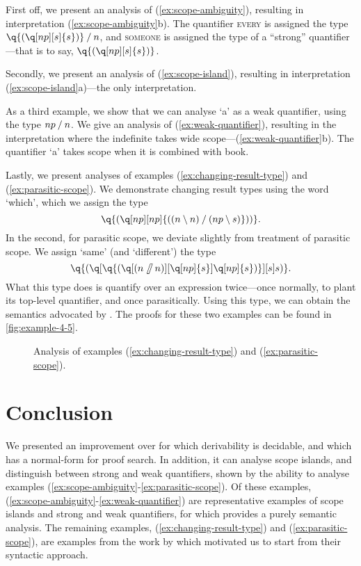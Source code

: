 \documentclass[10pt,a4paper]{llncs}
\begin{document}
First off, we present an analysis of (\ref{ex:scope-ambiguity}),
resulting in interpretation (\ref{ex:scope-ambiguity}b). The
quantifier \textsc{every} is assigned the type
$\q{(\q[np][s]{s})}\impl{n}$, and \textsc{someone} is assigned the
type of a ``strong'' quantifier---that is to say,
$\q{(\q[np][s]{s})}$.
%

%
Secondly, we present an analysis of (\ref{ex:scope-island}), resulting
in interpretation (\ref{ex:scope-island}a)---the only interpretation.
%

%
As a third example, we show that we can analyse `a' as a weak
quantifier, using the type ${np}\mathbin{\slash}{n}$.
We give an analysis of (\ref{ex:weak-quantifier}), resulting in the
interpretation where the indefinite takes wide
scope---(\ref{ex:weak-quantifier}b).
The quantifier `a' takes scope when it is combined with book.
%

%
Lastly, we present analyses of examples
(\ref{ex:changing-result-type}) and (\ref{ex:parasitic-scope}).
We demonstrate changing result types using the word `which', which we
assign the type
$$
\q{(\q[np][np]{(({n}\impr{n})\impl({np}\impr{s})}))}.
$$
In the second, for parasitic scope, we deviate slightly from
 treatment of parasitic scope. We assign `same'
(and `different') the type
$$
\q{(\q[{\q{(\q[({n}\himpl{n})][{\q[np]{s}}]{\q[np]{s}})}}][s]{s})}.
$$
What this type does is quantify over an expression twice---once
normally, to plant its top-level quantifier, and once parasitically.
Using this type, we can obtain the semantics advocated by
\citet{kiselyov2015b}.
The proofs for these two examples can be found in
\autoref{fig:example-4-5}.

\begin{sidewaysfigure}[ht!]
  \centering
  
  
  \caption{Analysis of examples (\ref{ex:changing-result-type}) and
    (\ref{ex:parasitic-scope}).}
  \label{fig:example-4-5}
\end{sidewaysfigure}


\section{Conclusion}
We presented an improvement over  {\NLCL} for which
derivability is decidable, and which has a normal-form for proof
search. In addition, it can analyse scope islands, and distinguish
between strong and weak quantifiers, shown by the ability to analyse
examples (\ref{ex:scope-ambiguity}-\ref{ex:parasitic-scope}).
Of these examples, (\ref{ex:scope-ambiguity}-\ref{ex:weak-quantifier})
are representative examples of scope islands and strong and weak
quantifiers, for which \citet{kiselyov2014} provides a purely semantic
analysis. The remaining examples, (\ref{ex:changing-result-type}) and
(\ref{ex:parasitic-scope}), are examples from the work by
\citet{barker2015} which motivated us to start from their syntactic
approach.



\end{document}
